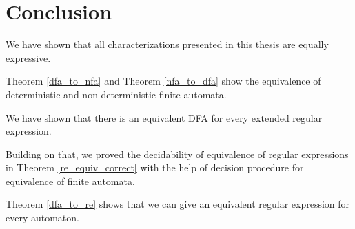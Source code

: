 \chapter{Conclusion}
\label{chap:conclusion}
We have shown that all characterizations presented in this thesis
are equally expressive.

Theorem \ref{dfa_to_nfa} and Theorem \ref{nfa_to_dfa} 
show the equivalence of deterministic and non-deterministic finite automata.


We have shown that there is an equivalent DFA for every extended regular expression.


Building on that, we proved the decidability of equivalence of regular expressions in Theorem \ref{re_equiv_correct} with the help of decision procedure for equivalence of finite automata.


Theorem \ref{dfa_to_re} shows that we can give an equivalent regular expression for every automaton.

